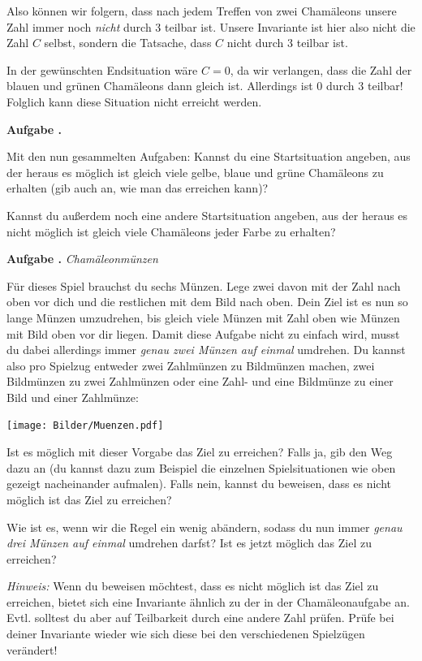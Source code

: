 \documentclass[a4paper,ngerman,12pt]{scrartcl}
\theoremstyle{definition}
\theoremstyle{plain}
\theoremstyle{remark}
\newlength{\aufgabenskip}
\newcounter{aufgabennummer}
\newenvironment{aufgabe}[1]{
	\addtocounter{aufgabennummer}{1}
	\textbf{Aufgabe \theaufgabennummer.} \emph{#1} \par
}{\vspace{\aufgabenskip}}
\begin{document}
Also können wir folgern, dass nach jedem Treffen von zwei Chamäleons unsere Zahl immer noch \emph{nicht} durch 3 teilbar ist. Unsere Invariante ist hier also nicht die Zahl $C$ selbst, sondern die Tatsache, dass $C$ nicht durch 3 teilbar ist. 

In der gewünschten Endsituation wäre $C = 0$, da wir verlangen, dass die Zahl der blauen und grünen Chamäleons dann gleich ist. Allerdings ist $0$ durch $3$ teilbar! Folglich kann diese Situation nicht erreicht werden.

\begin{aufgabe}{}
	Mit den nun gesammelten Aufgaben: Kannst du eine Startsituation angeben, aus der heraus es möglich ist gleich viele gelbe, blaue und grüne Chamäleons zu erhalten (gib auch an, wie man das erreichen kann)?
	
	Kannst du außerdem noch eine andere Startsituation angeben, aus der heraus es nicht möglich ist gleich viele Chamäleons jeder Farbe zu erhalten?
\end{aufgabe}

\begin{aufgabe}{Chamäleonmünzen}
	Für dieses Spiel brauchst du sechs Münzen. Lege zwei davon mit der Zahl nach oben vor dich und die restlichen mit dem Bild nach oben. Dein Ziel ist es nun so lange Münzen umzudrehen, bis gleich viele Münzen mit Zahl oben wie Münzen mit Bild oben vor dir liegen. Damit diese Aufgabe nicht zu einfach wird, musst du dabei allerdings immer \emph{genau zwei Münzen auf einmal } umdrehen. Du kannst also pro Spielzug entweder zwei Zahlmünzen zu Bildmünzen machen, zwei Bildmünzen zu zwei Zahlmünzen oder eine Zahl- und eine Bildmünze zu einer Bild und einer Zahlmünze:
	
	\begin{center}
		\texttt{[image: Bilder/Muenzen.pdf]}
	\end{center}
	
	Ist es möglich mit dieser Vorgabe das Ziel zu erreichen? Falls ja, gib den Weg dazu an (du kannst dazu zum Beispiel die einzelnen Spielsituationen wie oben gezeigt nacheinander aufmalen). Falls nein, kannst du beweisen, dass es nicht möglich ist das Ziel zu erreichen? 
	
	Wie ist es, wenn wir die Regel ein wenig abändern, sodass du nun immer \emph{genau drei Münzen auf einmal} umdrehen darfst? Ist es jetzt möglich das Ziel zu erreichen?
	
	\emph{Hinweis:} Wenn du beweisen möchtest, dass es nicht möglich ist das Ziel zu erreichen, bietet sich eine Invariante ähnlich zu der in der Chamäleonaufgabe an. Evtl. solltest du aber auf Teilbarkeit durch eine andere Zahl prüfen. Prüfe bei deiner Invariante wieder wie sich diese bei den verschiedenen Spielzügen verändert!
\end{aufgabe}
\end{document}
